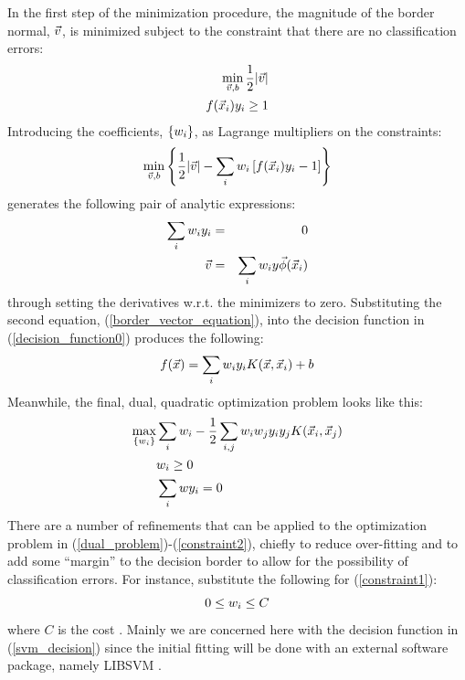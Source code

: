 \documentclass[11pt]{article}
\begin{document}
In the first step of the minimization procedure, 
the magnitude of the border normal, $\vec v$, 
is minimized subject to the constraint that there are no classification 
errors:
\begin{eqnarray}
	\min_{\vec v, b} \frac{1}{2} | \vec v | \\ \nonumber
	f(\vec {x}_i) y_i \ge 1
\end{eqnarray}
Introducing the coefficients, $\lbrace w_i \rbrace$, 
as Lagrange multipliers on the constraints:
\begin{equation}
	\min_{\vec v, b} \left \lbrace \frac{1}{2} | \vec v | - \sum_i w_i \left [ f(\vec {x}_i) y_i -1 \right ] \right \rbrace
\end{equation}
generates the following pair of analytic expressions:
\begin{eqnarray}
	\sum_i w_i y_i & = & 0 \\
	\vec v & = & \sum_i w_i y \vec\phi(\vec {x}_i) \label{border_vector_equation}
\end{eqnarray}
through setting the derivatives w.r.t. the minimizers to zero.
Substituting the second equation, (\ref{border_vector_equation}),
into the decision function in (\ref{decision_function0}) produces the following:
\begin{equation}
	f(\vec {x}) = \sum_i w_i y_i K (\vec {x}, \vec {x}_i) + b
	\label{svm_decision}
\end{equation}
Meanwhile, the final, dual, quadratic optimization problem looks like this:
\begin{eqnarray}
	\max_{\lbrace w_i \rbrace} & \sum_i w_i 
	- \frac{1}{2} \sum_{i, j} w_i w_j y_i y_j K(\vec {x}_i, \vec {x}_j) \label{dual_problem} \\
	& w_i \ge 0 \label{constraint1} \\
	& \sum_i w y_i = 0 \label{constraint2}
\end{eqnarray}
There are a number of refinements that can be applied to the optimization
problem in (\ref{dual_problem})-(\ref{constraint2}), chiefly to reduce over-fitting and to add
some ``margin'' to the decision border to allow for the possibility of
classification errors.
For instance, substitute the following for (\ref{constraint1}):
\begin{equation}
 0 \le w_i \le C
\end{equation}
where $C$ is the cost \citep{kernel_intro}.
Mainly we are concerned here with the decision
function in (\ref{svm_decision}) since the initial fitting will be done with
an external software package, namely LIBSVM \citep{Chang_Lin2011}.
\end{document}
